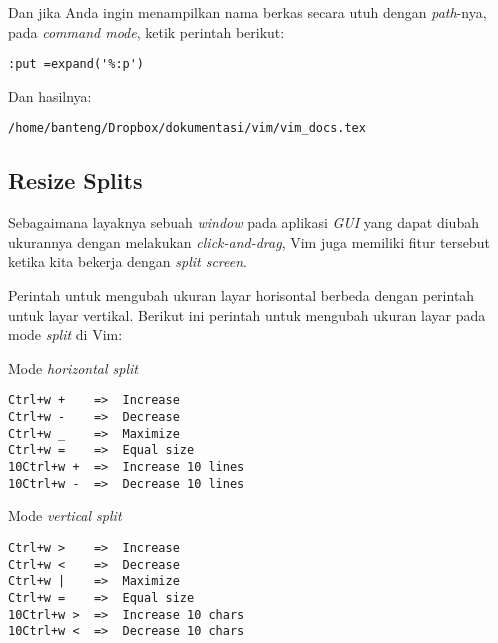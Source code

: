 \documentclass{article}
\begin{document}
Dan jika Anda ingin menampilkan nama berkas secara utuh
dengan \emph{path}-nya, pada \emph{command mode}, ketik
perintah berikut:

\begin{verbatim}
:put =expand('%:p')
\end{verbatim}

Dan hasilnya:

\begin{verbatim}
/home/banteng/Dropbox/dokumentasi/vim/vim_docs.tex
\end{verbatim}

\subsection{Resize Splits}
Sebagaimana layaknya sebuah \emph{window} pada aplikasi
\emph{GUI} yang dapat diubah ukurannya dengan melakukan
\emph{click-and-drag}, Vim juga memiliki fitur tersebut
ketika kita bekerja dengan \emph{split screen}.

Perintah untuk mengubah ukuran layar horisontal berbeda
dengan perintah untuk layar vertikal. Berikut ini perintah
untuk mengubah ukuran layar pada mode \emph{split} di Vim:

Mode \emph{horizontal split}
\begin{verbatim}
Ctrl+w +    =>  Increase
Ctrl+w -    =>  Decrease
Ctrl+w _    =>  Maximize
Ctrl+w =    =>  Equal size
10Ctrl+w +  =>  Increase 10 lines
10Ctrl+w -  =>  Decrease 10 lines
\end{verbatim}

Mode \emph{vertical split}
\begin{verbatim}
Ctrl+w >    =>  Increase
Ctrl+w <    =>  Decrease
Ctrl+w |    =>  Maximize
Ctrl+w =    =>  Equal size
10Ctrl+w >  =>  Increase 10 chars
10Ctrl+w <  =>  Decrease 10 chars
\end{verbatim}
\end{document}
